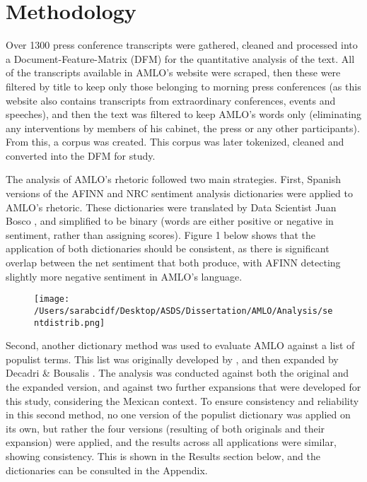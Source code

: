 \documentclass[]{article}
\begin{document}
\section{Methodology}

Over 1300 press conference transcripts were gathered, cleaned and processed into a Document-Feature-Matrix (DFM) for the quantitative analysis of the text. All of the transcripts available in AMLO's website \cite{noauthor_transcripciones_nodate} were scraped, then these were filtered by title to keep only those belonging to morning press conferences (as this website also contains transcripts from extraordinary conferences, events and speeches), and then the text was filtered to keep AMLO's words only (eliminating any interventions by members of his cabinet, the press or any other participants). From this, a corpus was created. This corpus was later tokenized, cleaned and converted into the DFM for study. 

The analysis of AMLO's rhetoric followed two main strategies. First, Spanish versions of the AFINN and NRC sentiment analysis dictionaries were applied to AMLO's rhetoric. These dictionaries were translated by Data Scientist Juan Bosco \cite{vega_lexicos_2023}, and simplified to be binary (words are either positive or negative in sentiment, rather than assigning scores). Figure 1 below shows that the application of both dictionaries should be consistent, as there is significant overlap between the net sentiment that both produce, with AFINN detecting slightly more negative sentiment in AMLO's language.

\begin{figure}[H]
	\centering
	\caption{\label{}}
	\texttt{[image: /Users/sarabcidf/Desktop/ASDS/Dissertation/AMLO/Analysis/sentdistrib.png]}
\end{figure}

Second, another dictionary method was used to evaluate AMLO against a list of populist terms. This list was originally developed by \cite{rooduijn_measuring_2011}, and then expanded by Decadri \& Bousalis \cite{decadri_populism_2020}. The analysis was conducted against both the original and the expanded version, and against two further expansions that were developed for this study, considering the Mexican context. To ensure consistency and reliability in this second method, no one version of the populist dictionary was applied on its own, but rather the four versions (resulting of both originals and their expansion) were applied, and the results across all applications were similar, showing consistency. This is shown in the Results section below, and the dictionaries can be consulted in the Appendix. 
\end{document}

